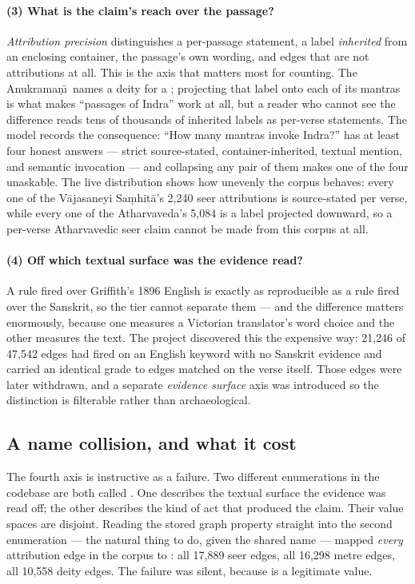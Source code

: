 \paragraph{(3) What is the claim's reach over the passage?} \emph{Attribution
precision} distinguishes a per-passage statement, a label \emph{inherited} from an
enclosing container, the passage's own wording, and edges that are not attributions at
all. This is the axis that matters most for counting. The Anukrama\d{n}\=\i\ names a
deity for a ; projecting that label onto each of its mantras is what
makes ``passages of Indra'' work at all, but a reader who cannot see the difference
reads tens of thousands of inherited labels as per-verse statements. The model records
the consequence: ``How many mantras invoke Indra?'' has at least four honest answers
--- strict source-stated, container-inherited, textual mention, and semantic
invocation --- and collapsing any pair of them makes one of the four unaskable. The
live distribution shows how unevenly the corpus behaves: every one of the
V\=ajasaneyi Sa\d{m}hit\=a's 2{,}240 seer attributions is source-stated per verse,
while every one of the Atharvaveda's 5{,}084 is a  label projected
downward, so a per-verse Atharvavedic seer claim cannot be made from this corpus at
all.

\paragraph{(4) Off which textual surface was the evidence read?} A rule fired over
Griffith's 1896 English is exactly as reproducible as a rule fired over the Sanskrit,
so the tier cannot separate them --- and the difference matters enormously, because
one measures a Victorian translator's word choice and the other measures the text.
The project discovered this the expensive way: 21{,}246 of 47{,}542
 edges had fired on an English keyword with no Sanskrit evidence
and carried an identical grade to edges matched on the verse itself. Those edges were
later withdrawn, and a separate \emph{evidence surface} axis was introduced so the
distinction is filterable rather than archaeological.

\subsection{A name collision, and what it cost}
\label{sec:collision}

The fourth axis is instructive as a failure. Two different enumerations in the
codebase are both called . One describes the textual surface the
evidence was read off; the other describes the kind of act that produced the claim.
Their value spaces are disjoint. Reading the stored graph property straight into the
second enumeration --- the natural thing to do, given the shared name --- mapped
\emph{every} attribution edge in the corpus to : all 17{,}889 seer
edges, all 16{,}298 metre edges, all 10{,}558 deity edges. The failure was silent,
because  is a legitimate value.

